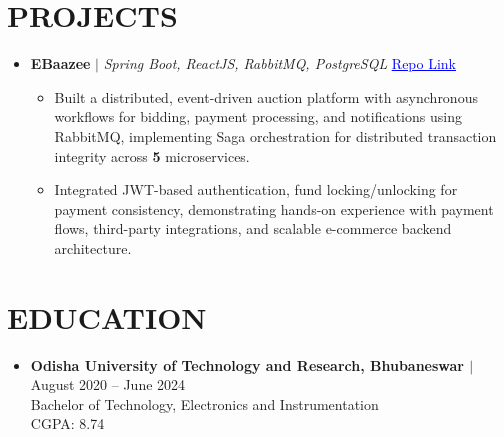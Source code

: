 \documentclass[a4paper,11pt]{article}
\begin{document}
\section{PROJECTS}
\begin{itemize}[leftmargin=0in, label={}]
  \item
    \textbf{EBaazee} $|$ \textit{Spring Boot, ReactJS, RabbitMQ, PostgreSQL} \hfill
    \href{https://github.com/BITSSAP2025AugAPIBP3Sections/APIBP-20242YB-Team-01}{\textcolor{blue}{\underline{Repo Link}}}
    \begin{itemize}[leftmargin=0.18in, itemsep=0.5pt, topsep=1pt]
      \item \small{Built a distributed, event-driven auction platform with asynchronous workflows for bidding, payment processing, and notifications using RabbitMQ, implementing Saga orchestration for distributed transaction integrity across \textbf{5} microservices.}
      \item \small{Integrated JWT-based authentication, fund locking/unlocking for payment consistency, demonstrating hands-on experience with payment flows, third-party integrations, and scalable e-commerce backend architecture.}

    \end{itemize}

\end{itemize}



\section{EDUCATION}
\begin{itemize}[leftmargin=0in, label={}]
  \item
    \textbf{\normalsize Odisha University of Technology and Research, Bhubaneswar $|$ }August 2020 -- June 2024 \\
    \normalsize Bachelor of Technology, Electronics and Instrumentation \\
    \normalsize CGPA: 8.74
\end{itemize}
\end{document}
